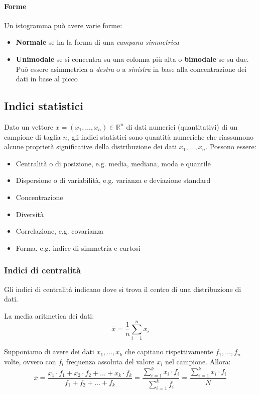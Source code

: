 \paragraph{Forme} Un istogramma può avere varie forme:
\begin{itemize}
	\item \textbf{Normale} se ha la forma di una \textit{campana simmetrica}
	\item \textbf{Unimodale} se si concentra su una colonna più alta o \textbf{bimodale} se su due. Può essere asimmetrica a \textit{destra} o a \textit{sinistra} in base alla concentrazione dei dati in base al picco
\end{itemize}

\subsection{Indici statistici}
Dato un vettore $x=(x_1, \ldots, x_n) \in \mathbb{R}^n$ di dati numerici (quantitativi) di un campione di taglia $n$, gli indici statistici sono quantità numeriche che riassumono alcune proprietà significative della distribuzione dei dati $x_1, \ldots, x_n$. Possono essere:
\begin{itemize}
	\item Centralità o di posizione, e.g. media, mediana, moda e quantile
	\item Dispersione o di variabilità, e.g. varianza e deviazione standard
	\item Concentrazione
	\item Diversità
	\item Correlazione, e.g. covarianza
	\item Forma, e.g. indice di simmetria e curtosi
\end{itemize}

\subsubsection{Indici di centralità}
Gli indici di centralità indicano dove si trova il centro di una distribuzione di dati.

\begin{definition}
	La media aritmetica dei dati:
	\begin{equation}
		\bar{x} = \frac{1}{n} \sum_{i=1}^{n} x_i
	\end{equation}
\end{definition}

\begin{definition}
	Supponiamo di avere dei dati $x_1, \ldots, x_k$ che capitano rispettivamente $f_1, \ldots, f_n$ volte, ovvero con $f_i$ frequenza assoluta del valore $x_i$ nel campione. Allora:
	\begin{equation}
		\bar{x} = \frac{x_1 \cdot f_1 + x_2 \cdot f_2 + \ldots + x_k \cdot f_k}{f_1 + f_2 + \ldots + f_k} = \frac{\sum_{i=1}^{k} x_i \cdot f_i}{\sum_{i=1}^{k}f_i} = \frac{\sum_{i=1}^{k}x_i \cdot f_i}{N}
	\end{equation}
\end{definition}

